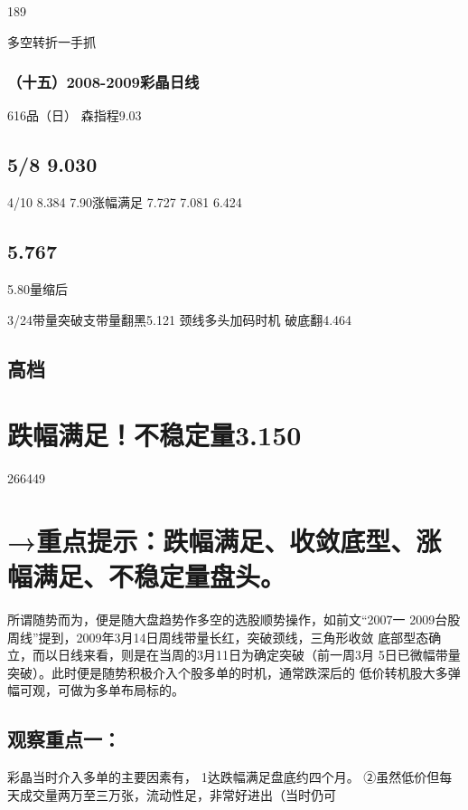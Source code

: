 \documentclass{article}
\begin{document}
189

\clearpage

多空转折一手抓

\subsubsection{（十五）2008-2009彩晶日线}

616品（日） 森指程9.03

\subsection{5/8 9.030}

4/10 8.384 7.90涨幅满足 7.727 7.081 6.424

\subsection{5.767}

5.80量缩后

3/24带量突破支带量翻黑5.121 颈线多头加码时机 破底翻4.464

\subsection{高档}

\section{跌幅满足！不稳定量3.150}

266449

\section{→重点提示：跌幅满足、收敛底型、涨幅满足、不稳定量盘头。}

所谓随势而为，便是随大盘趋势作多空的选股顺势操作，如前文“2007一 2009台股周线”提到，2009年3月14日周线带量长红，突破颈线，三角形收敛 底部型态确立，而以日线来看，则是在当周的3月11日为确定突破（前一周3月 5日已微幅带量突破）。此时便是随势积极介入个股多单的时机，通常跌深后的 低价转机股大多弹幅可观，可做为多单布局标的。

\subsection{观察重点一：}

彩晶当时介入多单的主要因素有， 1达跌幅满足盘底约四个月。 ②虽然低价但每天成交量两万至三万张，流动性足，非常好进出（当时仍可
\end{document}
